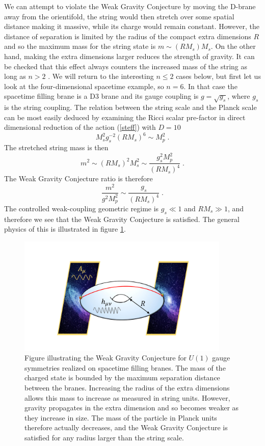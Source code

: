 \documentclass[11pt,a4paper]{article}
\numberwithin{equation}{section}
\numberwithin{table}{section}\setlength{\multlinegap}{25pt}
\newcommand{\be}{\begin{equation}}
\newcommand{\ee}{\end{equation}}
\begin{document}
We can attempt to violate the Weak Gravity Conjecture by moving the D-brane away from the orientifold, the string would then stretch over some spatial distance making it massive, while its charge would remain constant. However, the distance of separation is limited by the radius of the compact extra dimensions $R$ and so the maximum mass for the string state is $m \sim \left( R M_s \right) M_s$. On the other hand, making the extra dimensions larger reduces the strength of gravity. It can be checked that this effect always counters the increased mass of the string as long as $n>2$ \cite{ArkaniHamed:2006dz}. We will return to the interesting $n \leq 2$ cases below, but first let us look at the four-dimensional spacetime example, so $n=6$. In that case the spacetime filling brane is a D3 brane and its gauge coupling is $g = \sqrt{g_s}$, where $g_s$ is the string coupling. The relation between the string scale and the Planck scale can be most easily deduced by examining the Ricci scalar pre-factor in direct dimensional reduction of the action (\ref{steff}) with $D=10$ 
\be
\label{MsMprel}
M_s^{2} g_s^{-2} \left(R M_s\right)^6 \sim M_p^2\;.
\ee
The stretched string mass is then
\be
m^2 \sim \left(R M_s\right)^2 M_s^2 \sim \frac{g_s^2 M_p^2 }{\left(R M_s\right)^4} \;.
\ee
The Weak Gravity Conjecture ratio is therefore
\be
\frac{m^2}{g^2 M_p^2} \sim \frac{g_s}{ \left(R M_s\right)^4} \;.
\ee
The controlled weak-coupling geometric regime is $g_s \ll 1$ and $RM_s \gg 1$, and therefore we see that the Weak Gravity Conjecture is satisfied. The general physics of this is illustrated in figure \ref{fig:brsep}. 
\begin{figure}[t]
\centering
 \includegraphics[width=0.9\textwidth]{branesepar.pdf}
\caption{Figure illustrating the Weak Gravity Conjecture for $U(1)$ gauge symmetries realized on spacetime filling branes. The mass of the charged state is bounded by the maximum separation distance between the branes. Increasing the radius of the extra dimensions allows this mass to increase as measured in string units. However, gravity propagates in the extra dimension and so becomes weaker as they increase in size. The mass of the particle in Planck units therefore actually decreases, and the Weak Gravity Conjecture is satisfied for any radius larger than the string scale.}
\label{fig:brsep}
\end{figure}
\end{document}
